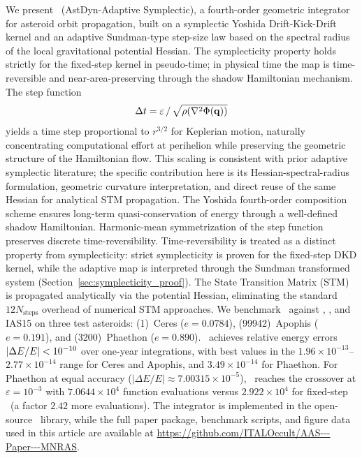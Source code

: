 
We present \AAS\ (AstDyn-Adaptive Symplectic), a fourth-order
geometric integrator for asteroid orbit propagation, built on a
symplectic Yoshida Drift-Kick-Drift kernel and an adaptive
Sundman-type step-size law based on the spectral radius of the local
gravitational potential Hessian.
The symplecticity property holds strictly for the fixed-step kernel 
in pseudo-time; in physical time the map is time-reversible and 
near-area-preserving through the shadow Hamiltonian mechanism.
The step function
\[
  \Delta t = \varepsilon \,/\, \sqrt{\rho\!\left(\nabla^2\Phi(\mathbf{q})\right)}
\]
yields a time step proportional to $r^{3/2}$ for Keplerian motion,
naturally concentrating computational effort at perihelion while
preserving the geometric structure of the Hamiltonian flow.
This scaling is consistent with prior adaptive symplectic literature;
the specific contribution here is its Hessian-spectral-radius
formulation, geometric curvature interpretation, and direct reuse of
the same Hessian for analytical STM propagation.
The Yoshida fourth-order composition scheme ensures long-term
quasi-conservation of energy through a well-defined shadow Hamiltonian.
Harmonic-mean symmetrization of the step function preserves
discrete time-reversibility.
Time-reversibility is treated as a distinct property from
symplecticity: strict symplecticity is proven for the fixed-step
DKD kernel, while the adaptive map is interpreted through the
Sundman transformed system (Section~\ref{sec:symplecticity_proof}).
The State Transition Matrix (STM) is propagated analytically via the
potential Hessian, eliminating the standard $12N_{\mathrm{steps}}$
overhead of numerical STM approaches.
We benchmark \AAS\ against \saba, \rkf, and
IAS15 \citep{ReinSpiegel2015} on three test asteroids:
(1)~Ceres ($e=0.0784$), (99942)~Apophis ($e=0.191$),
and (3200)~Phaethon ($e=0.890$).
\AAS\ achieves relative energy errors $|\Delta E/E| < 10^{-10}$ over
one-year integrations, with best values in the
$1.96\times10^{-13}$--$2.77\times10^{-14}$ range for
Ceres and Apophis, and $3.49\times10^{-14}$ for Phaethon.
For Phaethon at equal accuracy
($|\Delta E/E|\approx7.00315\times10^{-5}$),
\AAS\ reaches the crossover at $\varepsilon=10^{-3}$ with
$7.0644\times10^4$ function evaluations versus
$2.922\times10^4$ for fixed-step \saba\
(a factor $2.42$ more evaluations).
The integrator is implemented in the open-source \astdyn\ library,
while the full paper package, benchmark scripts, and figure data used in this
article are available at \url{https://github.com/ITALOccult/AAS---Paper---MNRAS}.
